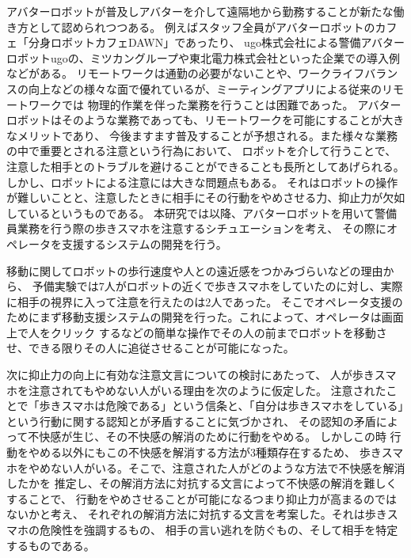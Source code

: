 \documentclass{kuisthesis}
\date{2024年1月31日}
\begin{document}
\maketitle

\begin{jabstract}


アバターロボットが普及しアバターを介して遠隔地から勤務することが新たな働き方として認められつつある。
例えばスタッフ全員がアバターロボットのカフェ「分身ロボットカフェDAWN」であったり、
ugo株式会社による警備アバターロボットugoの、ミツカングループや東北電力株式会社といった企業での導入例などがある。
リモートワークは通勤の必要がないことや、ワークライフバランスの向上などの様々な面で優れているが、ミーティングアプリによる従来のリモートワークでは
物理的作業を伴った業務を行うことは困難であった。
アバターロボットはそのような業務であっても、リモートワークを可能にすることが大きなメリットであり、
今後ますます普及することが予想される。また様々な業務の中で重要とされる注意という行為において、
ロボットを介して行うことで、注意した相手とのトラブルを避けることができることも長所としてあげられる。
しかし、ロボットによる注意には大きな問題点もある。
それはロボットの操作が難しいことと、注意したときに相手にその行動をやめさせる力、抑止力が欠如しているというものである。
本研究では以降、アバターロボットを用いて警備員業務を行う際の歩きスマホを注意するシチュエーションを考え、
その際にオペレータを支援するシステムの開発を行う。

移動に関してロボットの歩行速度や人との遠近感をつかみづらいなどの理由から、
予備実験では7人がロボットの近くで歩きスマホをしていたのに対し、実際に相手の視界に入って注意を行えたのは2人であった。
そこでオペレータ支援のためにまず移動支援システムの開発を行った。これによって、オペレータは画面上で人をクリック
するなどの簡単な操作でその人の前までロボットを移動させ、できる限りその人に追従させることが可能になった。

次に抑止力の向上に有効な注意文言についての検討にあたって、
人が歩きスマホを注意されてもやめない人がいる理由を次のように仮定した。
注意されたことで「歩きスマホは危険である」という信条と、「自分は歩きスマホをしている」という行動に関する認知とが矛盾することに気づかされ、
その認知の矛盾によって不快感が生じ、その不快感の解消のために行動をやめる。
しかしこの時
行動をやめる以外にもこの不快感を解消する方法が3種類存在するため、
歩きスマホをやめない人がいる。そこで、注意された人がどのような方法で不快感を解消したかを
推定し、その解消方法に対抗する文言によって不快感の解消を難しくすることで、
行動をやめさせることが可能になるつまり抑止力が高まるのではないかと考え、
それぞれの解消方法に対抗する文言を考案した。それは歩きスマホの危険性を強調するもの、
相手の言い逃れを防ぐもの、そして相手を特定するものである。


\end{jabstract}
\end{document}

